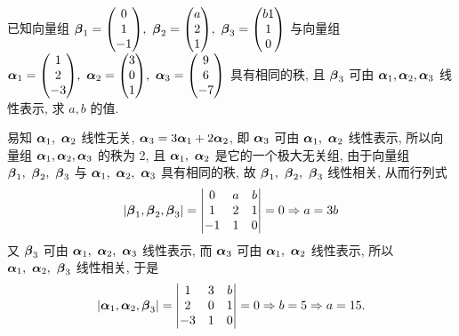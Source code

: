 \begin{example}[2000 数二]
    已知向量组 $\vb*{\beta}_1=\mqty(0\\1\\-1),~\vb*{\beta}_2=\mqty(a\\2\\1),~\vb*{\beta}_3=\mqty(b1\\1\\0)$ 与向量组 $\vb*{\alpha}_1=\mqty(1\\2\\-3),\\~\vb*{\alpha}_2=\mqty(3\\0\\1),~\vb*{\alpha}_3=\mqty(9\\6\\-7)$ 具有相同的秩, 且 $\vb*{\beta}_3$ 可由 $\vb*{\alpha}_1,\vb*{\alpha}_2,\vb*{\alpha}_3$ 线性表示, 求 $a,b$ 的值.
\end{example}
\begin{solution}
    易知 $\vb*{\alpha}_1,~\vb*{\alpha}_2$ 线性无关, $\vb*{\alpha}_3=3\vb*{\alpha}_1+2\vb*{\alpha}_2$, 即 $\vb*{\alpha}_3$ 可由 $\vb*{\alpha}_1,~\vb*{\alpha}_2$ 线性表示, 所以向量组 $\vb*{\alpha}_1,\vb*{\alpha}_2,\vb*{\alpha}_3$ 的秩为 2, 且 $\vb*{\alpha}_1,~\vb*{\alpha}_2$ 是它的一个极大无关组,
    由于向量组 $\vb*{\beta}_1,~\vb*{\beta}_2,~\vb*{\beta}_3$ 与 $\vb*{\alpha}_1,~\vb*{\alpha}_2,~\vb*{\alpha}_3$ 具有相同的秩, 故 $\vb*{\beta}_1,~\vb*{\beta}_2,~\vb*{\beta}_3$ 线性相关, 从而行列式
    $$|\vb*{\beta}_1,\vb*{\beta}_2,\vb*{\beta}_3|=\mqty|0&a&b\\1&2&1\\-1&1&0|=0\Rightarrow a=3b$$
    又 $\vb*{\beta}_3$ 可由 $\vb*{\alpha}_1,~\vb*{\alpha}_2,~\vb*{\alpha}_3$ 线性表示, 而 $\vb*{\alpha}_3$ 可由 $\vb*{\alpha}_1,~\vb*{\alpha}_2$ 线性表示, 所以 $\vb*{\alpha}_1,~\vb*{\alpha}_2,~\vb*{\beta}_3$ 线性相关, 于是
    $$|\vb*{\alpha}_1,\vb*{\alpha}_2,\vb*{\beta}_3|=\mqty|1&3&b\\2&0&1\\-3&1&0|=0\Rightarrow b=5\Rightarrow a=15.$$
\end{solution}

